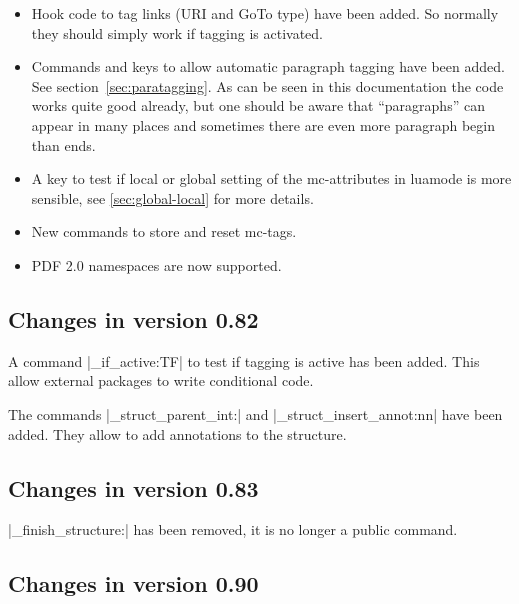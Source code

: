 \documentclass[DIV=12,parskip=half-,bibliography=totoc,a4paper]{article}
\begin{document}
\begin{itemize}
\item Hook code to tag links (URI and GoTo type) have been added. So normally they should simply work if tagging
is activated.

\item Commands and keys to allow automatic paragraph tagging have been added. See section~\ref{sec:paratagging}.
As can be seen in this documentation the code works quite good already, but one should be aware that \enquote{paragraphs} can appear in many places and sometimes there are even more paragraph begin than ends.

\item A key to test if local or global setting of the mc-attributes in luamode is more sensible, see \ref{sec:global-local} for more details.

\item New commands to store and reset mc-tags.

\item PDF 2.0 namespaces are now supported.
\end{itemize}

\subsection{Changes in version 0.82}

A command |\tag_if_active:TF| to test if tagging is active has been added. This allow external packages to write conditional code.

The commands |\tag_struct_parent_int:| and |\tag_struct_insert_annot:nn| have been added. They allow to
add annotations to the structure.


\subsection{Changes in version 0.83}

|\tag_finish_structure:| has been removed, it is no longer a public command.

\subsection{Changes in version 0.90}
\end{document}
